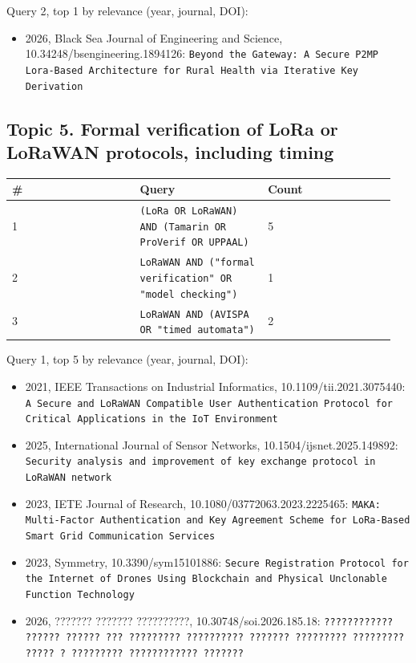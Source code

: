 Query 2, top 1 by relevance (year, journal, DOI):

\begin{itemize}
\item 2026, Black Sea Journal of Engineering and Science, 10.34248/bsengineering.1894126: \texttt{Beyond the Gateway: A Secure P2MP Lora-Based Architecture for Rural Health via Iterative Key Derivation}
\end{itemize}

\subsection*{Topic 5. Formal verification of LoRa or LoRaWAN protocols, including timing}

{\scriptsize\raggedright
\begin{longtable}{p{0.317\linewidth}p{0.317\linewidth}p{0.317\linewidth}}
\toprule
\# & Query & Count \\
\midrule
\endhead
1 & \texttt{(LoRa OR LoRaWAN) AND (Tamarin OR ProVerif OR UPPAAL)} & 5 \\
2 & \texttt{LoRaWAN AND ("formal verification" OR "model checking")} & 1 \\
3 & \texttt{LoRaWAN AND (AVISPA OR "timed automata")} & 2 \\
\bottomrule
\end{longtable}}

Query 1, top 5 by relevance (year, journal, DOI):

\begin{itemize}
\item 2021, IEEE Transactions on Industrial Informatics, 10.1109/tii.2021.3075440: \texttt{A Secure and LoRaWAN Compatible User Authentication Protocol for Critical Applications in the IoT Environment}
\item 2025, International Journal of Sensor Networks, 10.1504/ijsnet.2025.149892: \texttt{Security analysis and improvement of key exchange protocol in LoRaWAN network}
\item 2023, IETE Journal of Research, 10.1080/03772063.2023.2225465: \texttt{MAKA: Multi-Factor Authentication and Key Agreement Scheme for LoRa-Based Smart Grid Communication Services}
\item 2023, Symmetry, 10.3390/sym15101886: \texttt{Secure Registration Protocol for the Internet of Drones Using Blockchain and Physical Unclonable Function Technology}
\item 2026, ??????? ??????? ??????????, 10.30748/soi.2026.185.18: \texttt{???????????? ?????? ?????? ??? ????????? ?????????? ??????? ????????? ????????? ????? ? ????????? ???????????? ???????}
\end{itemize}

